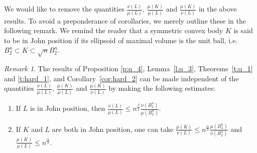 \documentclass[11pt]{amsart}
\theoremstyle{definition}
\theoremstyle{remark}
\newtheorem{remark}[theorem]{Remark}
\numberwithin{equation}{section}
\begin{document}
We would like to remove the quantities $\frac{\nu(L)}{\mu(L)}$, $\frac{\mu(K)}{\mu(L)}$ and $\frac{\mu(K)}{\nu(L)}$ in the above results.  To avoid a preponderance of corollaries, we merely outline these in the following remark. We remind the reader that a symmetric convex body $K$ is said to be in John position if its ellipsoid of maximal volume is the unit ball, i.e. $B_2^n\subset K\subset \sqrt{n} B_2^n$.

\begin{remark}
The results of Proposition \ref{p:q_4}, Lemma~\ref{l:q_3}, Theorems~\ref{t:q_1} and \ref{t:hard_1}, and Corollary~\ref{cor:hard_2} can be made independent of the quantities $\frac{\nu(L)}{\mu(L)}$, $\frac{\mu(K)}{\mu(L)}$ and $\frac{\mu(K)}{\nu(L)}$ by making the following estimates:
\begin{enumerate}
\item If $L$ is in John position, then $\frac{\nu(L)}{\mu(L)} \leq n^\frac{\beta}{2} \frac{\nu(B_2^n)}{\mu(B_2^n)}$.
    \item If $K$ and $L$ are both in John position, one can take $\frac{\mu(K)}{\nu(L)}\leq n^{\frac{\alpha}{2}}\frac{\mu(B_2^n)}{\nu(B_2^n)}$ and $\frac{\mu(K)}{\mu(L)}\leq n^{\frac{\alpha}{2}}.$
\end{enumerate}
\end{remark}
\end{document}
